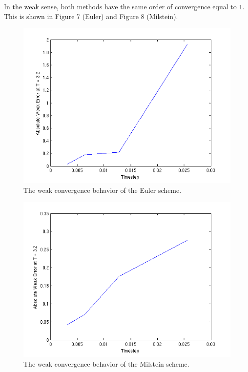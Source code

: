\documentclass[11pt]{article}
\begin{document}
In the weak sense, both methods have the same order of convergence equal to $1$.  This is shown in Figure 7 (Euler) and Figure 8 (Milstein).
 \begin{figure}[h]
 \includegraphics{Figures/euler_weak.png}
 \caption{The weak convergence behavior of the Euler scheme.}
\end{figure}
\clearpage

 \begin{figure}[h]
 \includegraphics{Figures/milstein_weak.png}
 \caption{The weak convergence behavior of the Milstein scheme.}
\end{figure}
\clearpage
\end{document}
